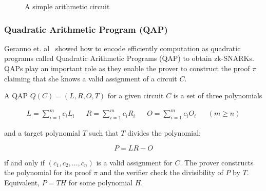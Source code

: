 \begin{figure}[ht!]
  \center
  \caption{A simple arithmetic circuit}
  \label{fig:zkp:circuit}
\end{figure}

\subsubsection[Quadratic Arithmetic Program (QAP)]{Quadratic Arithmetic Program (QAP)~\cite{zksnark_basics, zcash_snarks}}
\label{zkp:snarks:qap}

Geranno et. al~\cite{ggpr} showed how to encode efficiently computation as quadratic programs called Quadratic Arithmetic Programs (QAP) to obtain zk-SNARKs. QAPs play an important role as they enable the prover to construct the proof $\pi$ claiming that she knows a valid assignment of a circuit $C$.

A  QAP $Q(C) = (L, R, O, T)$ for a given circuit $C$ is a set of three polynomials

\begin{align*}
  L = \sum_{i=1}^{m}c_{i}L_{i} && R = \sum_{i=1}^{m}c_{i}R_{i} && O = \sum_{i=1}^{m}c_{i}O_{i} && (m \geq n)
\end{align*}

and a target polynomial $T$ such that $T$ divides the polynomial:

\begin{equation*}
  P = LR - O
\end{equation*}

if and only if $(c_1, c_2, \dots, c_n)$ is a valid assignment for $C$. The prover constructs the polynomial for its proof $\pi$ and the verifier check the divisibility of $P$ by $T$. Equivalent, $P = TH$ for some polynomial $H$.

